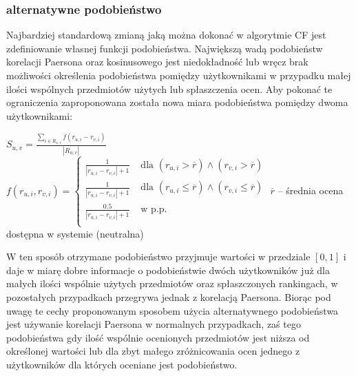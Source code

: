 \documentclass{pracamgr}
\begin{document}
    \subsubsection{alternatywne podobieństwo}
     Najbardziej standardową zmianą jaką można dokonać w algorytmie CF jest zdefiniowanie własnej funkcji podobieństwa.\newline
     Największą wadą podobieństw korelacji Paersona oraz kosinusowego jest niedokładność lub wręcz brak możliwości określenia podobieństwa pomiędzy użytkownikami
     w przypadku małej ilości wspólnych przedmiotów użytych lub spłaszczenia ocen.
     Aby pokonać te ograniczenia zaproponowana została nowa miara podobieństwa pomiędzy dwoma użytkownikami:\newline
     \begin{center}
      $S_{u,v}=\frac{\sum\limits_{i\in R_{u,v}}f(r_{u,i}-r_{v,i})}{|R_{u,v}|}$\newline
      $f(r_{u,i},r_{v,i})=\left\{\begin{array}{cc}
                                 \frac{1}{|r_{u,i}-r_{v,i}|+1}& \text{ dla } (r_{u,i}>\overline{r})\wedge(r_{v,i}>\overline{r})\\
                                 \frac{1}{|r_{u,i}-r_{v,i}|+1}& \text{ dla } (r_{u,i}\le\overline{r})\wedge(r_{v,i}\le\overline{r})\\
                                 \frac{0.5}{|r_{u,i}-r_{v,i}|+1}& \text{ w p.p.}\\
                                \end{array}\right.$\newline
     {\scriptsize
     $\overline{r}$ -- średnia ocena dostępna w systemie (neutralna)
     }\newline    
     \end{center}
     W ten sposób otrzymane podobieństwo przyjmuje wartości w przedziale $[0,1]$ i daje w miarę dobre informacje o podobieństwie dwóch użytkowników
     już dla małych ilości wspólnie użytych przedmiotów oraz spłaszczonych rankingach,
     w pozostałych przypadkach przegrywa jednak z korelacją Paersona.\newline
     Biorąc pod uwagę te cechy proponowanym sposobem użycia alternatywnego podobieństwa jest używanie korelacji Paersona w normalnych przypadkach,
     zaś tego podobieństwa gdy ilość wspólnie ocenionych przedmiotów jest niższa od określonej wartości lub dla zbyt małego zróżnicowania ocen
     jednego z użytkowników dla których oceniane jest podobieństwo.
\end{document}
